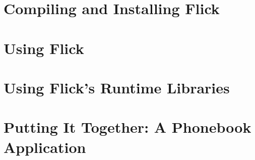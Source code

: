 \chapter{Compiling and Installing Flick}
\label{cha:Compiling and Installing Flick}


\chapter{Using Flick}
\label{cha:Using Flick}





\chapter{Using Flick's Runtime Libraries}
\label{cha:Using Flick's Runtime Libraries}


\chapter{Putting It Together: A Phonebook Application}
\label{cha:Putting It Together: A Phonebook Application}



